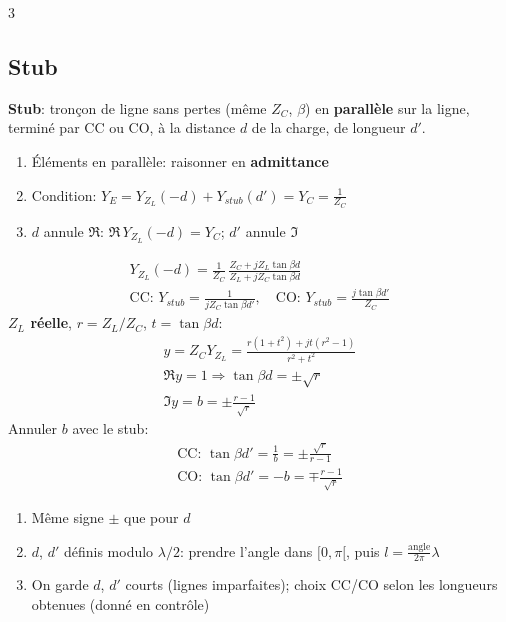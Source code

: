 \documentclass[12pt, a4paper]{article}
\begin{document}
\begin{multicols*}{3}
	\subsection{Stub}
	\textbf{Stub}: tronçon de ligne sans pertes (même $Z_C$, $\beta$) en \textbf{parallèle} sur la ligne, terminé par CC ou CO, à la distance $d$ de la charge, de longueur $d'$.
	\begin{enumerate}[\roman*.]
		\item Éléments en parallèle: raisonner en \textbf{admittance}
		\item Condition: $Y_E=Y_{Z_L}(-d)+Y_{stub}(d')=Y_C=\frac1{Z_C}$
		\item $d$ annule $\Re$: $\Re\,Y_{Z_L}(-d)=Y_C$; $d'$ annule $\Im$
	\end{enumerate}
	\begin{gather*}
		Y_{Z_L}(-d)=\frac1{Z_C}\,\frac{Z_C+jZ_L\tan\beta d}{Z_L+jZ_C\tan\beta d}\\
		\text{CC: }Y_{stub}=\frac{1}{jZ_C\tan\beta d'},\quad\text{CO: }Y_{stub}=\frac{j\tan\beta d'}{Z_C}
	\end{gather*}
	\textbf{$Z_L$ réelle}, $r=Z_L/Z_C$, $t=\tan\beta d$:
	\begin{gather*}
		y=Z_CY_{Z_L}=\frac{r(1+t^2)+jt(r^2-1)}{r^2+t^2}\\
		\Re y=1\Rightarrow\tan\beta d=\pm\sqrt r\\
		\Im y=b=\pm\frac{r-1}{\sqrt r}
	\end{gather*}
	Annuler $b$ avec le stub:
	\begin{gather*}
		\text{CC: }\tan\beta d'=\frac1b=\pm\frac{\sqrt r}{r-1}\\
		\text{CO: }\tan\beta d'=-b=\mp\frac{r-1}{\sqrt r}
	\end{gather*}
	\begin{enumerate}[\roman*.]
		\item Même signe $\pm$ que pour $d$
		\item $d$, $d'$ définis modulo $\lambda/2$: prendre l'angle dans $[0,\pi[$, puis $l=\frac{\text{angle}}{2\pi}\lambda$
		\item On garde $d$, $d'$ courts (lignes imparfaites); choix CC/CO selon les longueurs obtenues (donné en contrôle)
	\end{enumerate}

	\colbreak

\end{multicols*}
\end{document}
